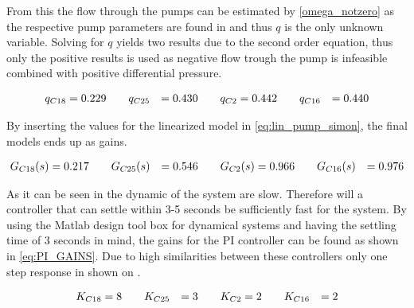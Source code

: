 From this the flow through the pumps can be estimated by \eqref{omega_notzero} as the respective pump parameters are found in  and thus $q$ is the only unknown variable.
Solving for $q$ yields two results due to the second order equation, thus only the positive results is used as negative flow trough the pump is infeasible combined with positive differential pressure.

\begin{equation}
\centering
\begin{split}
q_{C18} &= 0.229 \hspace{20pt} q_{C25} &= 0.430 \hspace{20pt} q_{C2} &= 0.442 \hspace{20pt} q_{C16} &= 0.440
\end{split}
\end{equation}

By inserting the values for the linearized model in \eqref{eq:lin_pump_simon}, the final models ends up as gains. 

\begin{equation}
\centering
	\begin{split}
	G_{C18}(s) &= 0.217 \hspace{20pt} G_{C25}(s) &= 0.546 \hspace{20pt} G_{C2}(s) &= 0.966 \hspace{20pt} G_{C16}(s) &= 0.976
	\end{split}
\end{equation}

As it can be seen in  the dynamic of the system are slow. Therefore will a controller that can settle within 3-5 seconds be sufficiently fast for the system.
By using the Matlab design tool box for dynamical systems and having the settling time of 3 seconds in mind, the gains for the PI controller can be found as shown in \eqref{eq:PI_GAINS}. 
Due to high similarities between these controllers only one step response in shown on .

\begin{equation}
\centering
	\begin{split}
	K_{C18} &= 8 \hspace{20pt} K_{C25} &= 3 \hspace{20pt} K_{C2} &= 2 \hspace{20pt} K_{C16} &= 2
	\end{split}
	\label{eq:PI_GAINS}
\end{equation}

